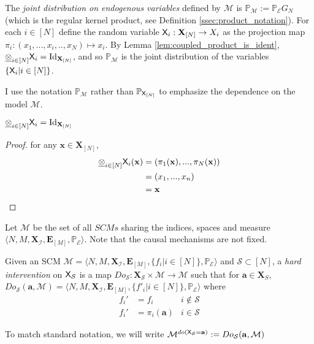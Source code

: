 \begin{definition}
The \emph{joint distribution on endogenous variables} defined by $\mathcal{M}$ is $\mathbb{P}_{\mathcal{M}}:=\mathbb{P}_\mathcal{E} G_N$ (which is the regular kernel product, see Definition \ref{ssec:product_notation}). For each $i\in[N]$ define the random variable $\mathsf{X}_i:\mathbf{X}_{[N]}\to X_i$ as the projection map $\pi_i:(x_1,...,x_i,..,x_N)\mapsto x_i$. By Lemma \ref{lem:coupled_product_is_ident}, $\underline{\otimes}_{i\in [N]} \mathsf{X}_i = \mathrm{Id}_{\mathbf{X}_{[N]}}$, and so $\mathbb{P}_{\mathcal{M}}$ is the joint distribution of the variables $\{\mathsf{X}_i|i\in[N]\}$.
\end{definition}

I use the notation $\mathbb{P}_{\mathcal{M}}$ rather than $\mathbb{P}_{\mathsf{X}_{[N]}}$ to emphasize the dependence on the model $\mathcal{M}$.

\begin{lemma}\label{lem:coupled_product_is_ident}
$\underline{\otimes}_{i\in [N]} \mathsf{X}_i = \mathrm{Id}_{\mathbf{X}_{[N]}}$
\end{lemma}

\begin{proof}
for any $\mathbf{x}\in \mathbf{X}_{[N]}$,
\begin{align}
\underline{\otimes}_{i\in [N]} \mathsf{X}_i (\mathbf{x}) &= (\pi_1(\mathbf{x}),...,\pi_N(\mathbf{x}))\\
	&= (x_1,...,x_n)\\
	&= \mathbf{x}
\end{align}
\end{proof}

\begin{definition}
Let $\mathscr{M}$ be the set of all $SCMs$ sharing the indices, spaces and measure $\langle N,M,\mathbf{X}_{\mathcal{I}},\mathbf{E}_{[M]},\mathbb{P}_{\mathcal{E}}\rangle$. Note that the causal mechanisms are not fixed.

Given an SCM $\mathcal{M}=\langle N,M,\mathbf{X}_{\mathcal{I}},\mathbf{E}_{[M]},\{f_i|i\in[N]\},\mathbb{P}_{\mathcal{E}}\rangle$ and $\mathcal{S}\subset[N]$, a \emph{hard intervention} on $\mathsf{X}_\mathcal{S}$ is a map $Do_{\mathcal{S}}:\mathbf{X}_\mathcal{S}\times\mathscr{M}\to \mathscr{M}$ such that for $\mathbf{a}\in \mathbf{X}_S$, $Do_{\mathcal{S}}(\mathbf{a},\mathcal{M}) = \langle N,M,\mathbf{X}_{\mathcal{I}},\mathbf{E}_{[M]},\{f'_i|i\in[N]\},\mathbb{P}_{\mathcal{E}}\rangle$ where
\begin{align}
	f_i' &= f_i  &i\not\in \mathcal{S}\\
	f_i' &= \pi_i(\mathbf{a}) & i\in \mathcal{S}
\end{align}

To match standard notation, we will write $\mathcal{M}^{do(\mathsf{X}_\mathcal{S} = \mathbf{a})}:=Do_{\mathcal{S}}(\mathbf{a},\mathcal{M})$
\end{definition}

